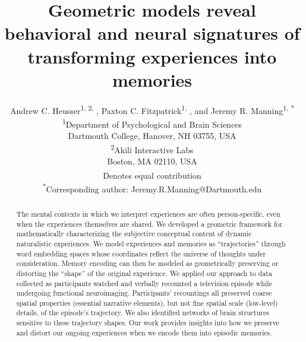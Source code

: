 \documentclass[10pt]{article}
\title{Geometric models reveal behavioral and neural signatures of transforming experiences into memories}
\author{Andrew C. Heusser\textsuperscript{1, 2, \textdagger}, Paxton C. Fitzpatrick\textsuperscript{1, \textdagger}, and Jeremy R. Manning\textsuperscript{1, *}\\\textsuperscript{1}Department of Psychological and Brain Sciences\\Dartmouth College, Hanover, NH 03755, USA\\\textsuperscript{2}Akili Interactive Labs\\Boston, MA 02110, USA\\\textsuperscript{\textdagger}Denotes equal contribution\\\textsuperscript{*}Corresponding author: Jeremy.R.Manning@Dartmouth.edu}
\begin{document}
\begin{titlepage}
  \maketitle
  \thispagestyle{empty}
  \end{titlepage}

\begin{abstract}
The mental contexts in which we interpret experiences are often person-specific, even when the experiences themselves are shared. We developed a geometric framework for mathematically characterizing the subjective conceptual content of dynamic naturalistic experiences. We model experiences and memories as ``trajectories'' through word embedding spaces whose coordinates reflect the universe of thoughts under consideration. Memory encoding can then be modeled as geometrically preserving or distorting the ``shape'' of the original experience. We applied our approach to data collected as participants watched and verbally recounted a television episode while undergoing functional neuroimaging. Participants’ recountings all preserved coarse spatial properties (essential narrative elements), but not fine spatial scale (low-level) details, of the episode’s trajectory. We also identified networks of brain structures sensitive to these trajectory shapes. Our work provides insights into how we preserve and distort our ongoing experiences when we encode them into episodic memories.
\end{abstract}
\end{document}
